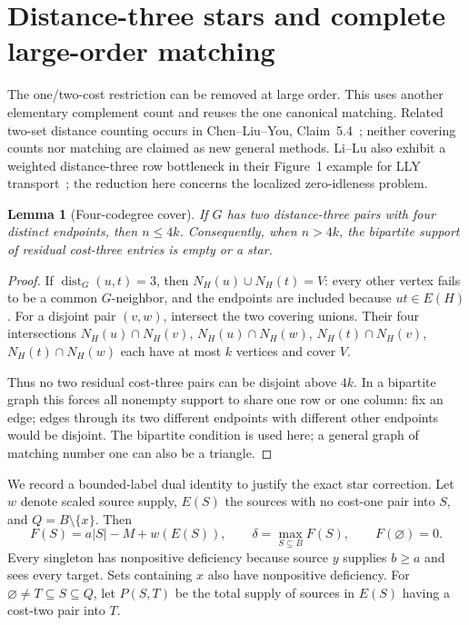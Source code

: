\documentclass[11pt]{article}
\newtheorem{lemma}[theorem]{Lemma}
\theoremstyle{remark}
\newcommand{\dist}{\operatorname{dist}}
\begin{document}
\section{Distance-three stars and complete large-order matching}\label{sec:star}

The one/two-cost restriction can be removed at large order. This uses another elementary complement count and reuses the one canonical matching. Related two-set distance counting occurs in Chen--Liu--You, Claim~5.4~\cite{chen}; neither covering counts nor matching are claimed as new general methods. Li--Lu also exhibit a weighted distance-three row bottleneck in their Figure~1 example for LLY transport~\cite{lilu}; the reduction here concerns the localized zero-idleness problem.

\begin{lemma}[Four-codegree cover]\label{lem:fourcover}
If $G$ has two distance-three pairs with four distinct endpoints, then $n\le4k$. Consequently, when $n>4k$, the bipartite support of residual cost-three entries is empty or a star.
\end{lemma}
\begin{proof}
If $\dist_G(u,t)=3$, then $N_H(u)\cup N_H(t)=V$: every other vertex fails to be a common $G$-neighbor, and the endpoints are included because $ut\in E(H)$. For a disjoint pair $(v,w)$, intersect the two covering unions. Their four intersections $N_H(u)\cap N_H(v)$, $N_H(u)\cap N_H(w)$, $N_H(t)\cap N_H(v)$, $N_H(t)\cap N_H(w)$ each have at most $k$ vertices and cover $V$.

Thus no two residual cost-three pairs can be disjoint above $4k$. In a bipartite graph this forces all nonempty support to share one row or one column: fix an edge; edges through its two different endpoints with different other endpoints would be disjoint. The bipartite condition is used here; a general graph of matching number one can also be a triangle.
\end{proof}

We record a bounded-label dual identity to justify the exact star correction. Let $w$ denote scaled source supply, $E(S)$ the sources with no cost-one pair into $S$, and $Q=B\setminus\{x\}$. Then
\[
 F(S)=a|S|-M+w(E(S)),\qquad \delta=\max_{S\subseteq B}F(S),\qquad F(\varnothing)=0.
\]
Every singleton has nonpositive deficiency because source $y$ supplies $b\ge a$ and sees every target. Sets containing $x$ also have nonpositive deficiency. For $\varnothing\ne T\subseteq S\subseteq Q$, let $P(S,T)$ be the total supply of sources in $E(S)$ having a cost-two pair into $T$.
\end{document}
